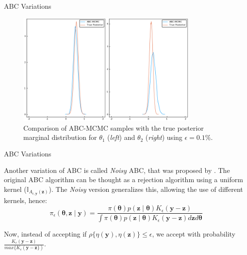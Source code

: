 \documentclass[10pt]{beamer}
\begin{document}
\begin{frame}[fragile]{ABC Variations}

    \begin{figure}[H]
        \centering
        \includegraphics[width=9cm]{images/ABC-MCMC.png}
        \caption{Comparison of ABC-MCMC samples with the true posterior
        marginal distribution for $\theta_1$ (\textit{left}) and
        $\theta_2$ (\textit{right}) using $\epsilon = 0.1\%$.
        }
    \end{figure}

\end{frame}

\begin{frame}[fragile]{ABC Variations}

  Another variation of ABC is called \textit{Noisy} ABC, that was
  proposed by \citet{Wilkinson2013}. The original ABC algorithm can
  be thought as a rejection algorithm using a uniform kernel
  ($\mathbb I_{A_{\epsilon, \bm y}(\bm z)}$). The \textit{Noisy} version
  generalizes this, allowing the use of different kernels, hence:
  $$
  \pi_\epsilon(\bm \theta, \bm z \mid \bm y) = 
  \frac{\pi(\bm \theta) p(\bm z \mid \bm \theta)
  K_\epsilon(\bm y - \bm z)}
  {\int \pi(\bm \theta)
  p(\bm z \mid \bm \theta)K_\epsilon(\bm y - \bm z)d\bm z d \bm \theta}
  $$

  Now, instead of accepting if
  $\rho\{\eta(\bm y),\eta(\bm z)\} \leq \epsilon$, we accept with 
  probability
  $\frac{K_\epsilon(\bm y - \bm z)}{max\{K_\epsilon(\bm y - \bm z\})}
  $.

\end{frame}
\end{document}
